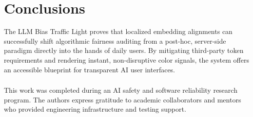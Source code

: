 \documentclass[runningheads]{llncs}
\begin{document}
\section{Conclusions}
\label{sec:conclusions}

The LLM Bias Traffic Light proves that localized embedding alignments can successfully shift algorithmic fairness auditing from a post-hoc, server-side paradigm directly into the hands of daily users. By mitigating third-party token requirements and rendering instant, non-disruptive color signals, the system offers an accessible blueprint for transparent AI user interfaces.

\begin{credits}
\subsubsection{\ackname}
This work was completed during an AI safety and software reliability research program. The authors express gratitude to academic collaborators and mentors who provided engineering infrastructure and testing support.
\subsubsection{\discintname}

\end{credits}
\newpage



\end{document}
